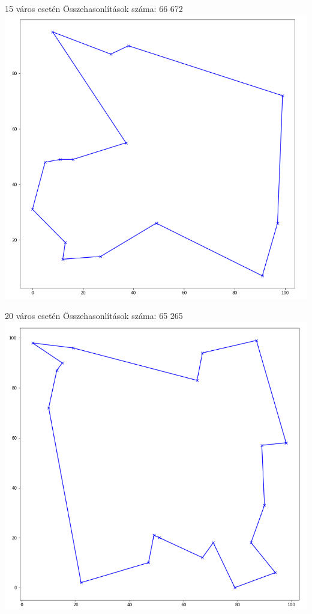 \documentclass[12pt,a4paper]{article}
\begin{document}
15 város esetén
Összehasonlítások száma: 66 672
\includegraphics[scale=0.4]{15.png}

20 város esetén
Összehasonlítások száma: 65 265
\includegraphics[scale=0.4]{20.png}
\end{document}
